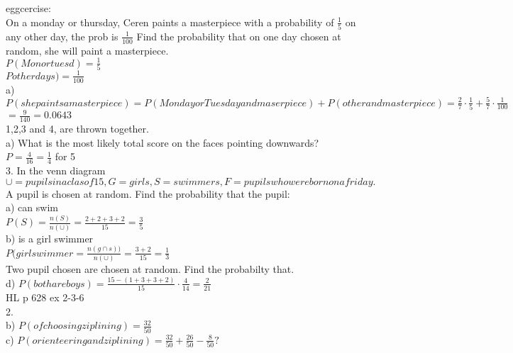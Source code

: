 \documentclass{article}
\begin{document}
  eggcercise:\\
  On a monday or thursday, Ceren paints a masterpiece with a probability of $\frac{1}{5}$ on any other day, the prob is $\frac{1}{100}$ Find the probability that on one day chosen at random, she will paint a masterpiece.\\
  $P(Mon or tuesd)=\frac{1}{5}$\\
  $P other days)=\frac{1}{100}$\\
  a) $P(she paints a masterpiece)=P(Monday or Tuesday and maserpiece)+P(other and masterpiece)=\frac{2}{7}\cdot\frac{1}{5}+\frac{5}{7}\cdot\frac{1}{100}$\\
  $=\frac{9}{140}=0.0643$\\
  1,2,3 and 4, are thrown together.\\
  a) What is the most likely total score on the faces pointing downwards?\\
  $P=\frac{4}{16}=\frac{1}{4}$ for 5\\
  3. In the venn diagram $\cup=pupils in a clas of 15, G=girls,S=swimmers,F=pupils who were born on a friday.$\\
  A pupil is chosen at random. Find the probability that the pupil:\\
  a) can swim\\
  $P(S)=\frac{n(S)}{n(\cup)}=\frac{2+2+3+2}{15}=\frac{3}{5}$\\
  b) is a girl swimmer\\
  $P(girl swimmer=\frac{n(g\cap s))}{n(\cup)}=\frac{3+2}{15}=\frac{1}{3}$\\
  Two pupil chosen are chosen at random. Find the probabilty that.\\
  d) $P(both are boys)=\frac{15-(1+3+3+2)}{15}\cdot\frac{4}{14}=\frac{2}{21}$\\
  HL p 628 ex 2-3-6\\
  2. \\
  b) $P(of choosing zip lining)=\frac{32}{50}$\\
  c) $P(orienteering and zip lining)=\frac{32}{50}+\frac{26}{50}-\frac{8}{50}?$

   
\end{document}

